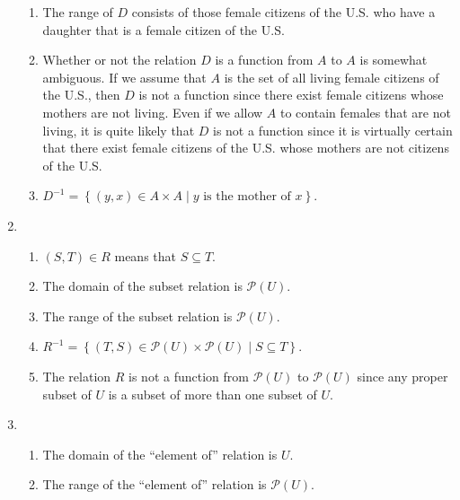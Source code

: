\begin{enumerate}
\begin{enumerate}
\item The range of  $D$  consists of those female citizens of the U.S. who have a daughter that is a female citizen of the U.S.

\item Whether or not the relation $D$ is a function from $A$ to $A$ is somewhat ambiguous.  If we assume that $A$ is the set of all living female citizens of the U.S., then $D$ is not a function since there exist female citizens whose mothers are not living.  Even if we allow $A$ to contain females that are not living, it is quite likely that $D$ is not a function since it is virtually certain that there exist female citizens of the U.S. whose mothers are not citizens of the U.S.

\item $D^{-1} = \left\{ \left( y, x \right) \in A \times A \mid y \text{ is the mother of } x \right\}$.
\end{enumerate}



\item \begin{enumerate}
\item $\left( {S, T} \right) \in R$ means that $S \subseteq T$.

\item The domain of the subset relation is $\mathcal{P} \left( U \right)$.

\item The range of the subset relation is $\mathcal{P} \left( U \right)$.

\item $R^{-1} = \left\{ \left(T, S \right) \in \mathcal{P} \left( U \right) \times 
\mathcal{P} \left( U \right) \mid S \subseteq T \right\}$.

\item The relation $R$ is not a function from $\mathcal{P} \left( U \right)$ to 
$\mathcal{P} \left( U \right)$ since any proper subset of $U$ is a subset of more than one subset of $U$.
\end{enumerate}



\item \begin{enumerate}
\item The domain of the ``element of'' relation is $U$.

\item The range of the ``element of'' relation is $\mathcal{P} \left( U \right)$.


\end{enumerate}
\end{enumerate}
